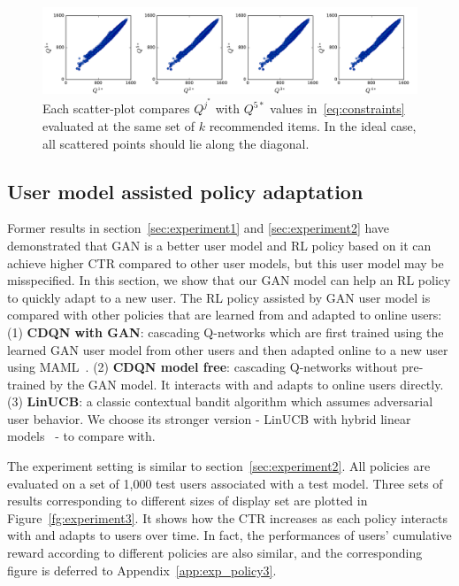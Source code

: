 \documentclass{article} %
\begin{document}
\begin{figure}[ht!]
\vspace{-2mm}
    \centering
    \includegraphics[width=\textwidth]{Figs/Q_constraints3.pdf}
\vspace{-7mm}    
\caption{\small Each scatter-plot compares $Q^{j^*}$ with $Q^{5*}$ values in~\eqref{eq:constraints} evaluated at the same set of $k$ recommended items. In the ideal case, all scattered points should lie along the diagonal.}
\label{fg:q_constraint}
\vspace{-1mm}
\end{figure}

\vspace{-3mm}
\subsection{User model assisted policy adaptation}\label{sec:experiment3}
\vspace{-2mm}

Former results in section~\ref{sec:experiment1} and \ref{sec:experiment2} have demonstrated that {\small GAN} is a better user model and RL policy based on it can achieve higher CTR compared to other user models, but this user model may be misspecified. In this section, we show that our {\small GAN} model can help an RL policy to quickly adapt to a new user. The RL policy assisted by {\small GAN} user model is compared with other policies that are learned from and adapted to online users: (1) {\bf CDQN with {\small GAN}}: cascading Q-networks which are first trained using the learned {\small GAN} user model from other users and then adapted online to a new user using MAML~\citep{FinAbbLev17}. (2) {\bf CDQN model free}: cascading Q-networks without pre-trained by the {\small GAN} model. It interacts with and adapts to online users directly. (3) {\bf LinUCB}: a classic contextual bandit algorithm which assumes adversarial user behavior. We choose its stronger version - LinUCB with hybrid linear models~\citep{LiChuLanSch10} - to compare with.

The experiment setting is similar to section~\ref{sec:experiment2}. All policies are evaluated on a set of 1,000 test users associated with a test model. 
Three sets of results corresponding to different sizes of display set are plotted in Figure~\ref{fg:experiment3}. It shows how the CTR increases as each policy interacts with and adapts to users over time. In fact, the performances of users' cumulative reward according to different policies are also similar, and the corresponding figure is deferred to Appendix~\ref{app:exp_policy3}.
\end{document}
